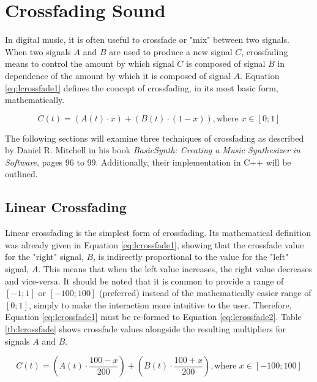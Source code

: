 \chapter{Crossfading Sound}

In digital music, it is often useful to crossfade or "mix" between two signals\footnotemark{}. When two signals $A$ and $B$ are used to produce a new signal $C$, crossfading means to control the amount by which signal $C$ is composed of signal $B$ in dependence of the amount by which it is composed of signal $A$. Equation \ref{eq:lcrossfade1} defines the concept of crossfading, in its most basic form, mathematically.

\begin{equation}
  C(t) = (A(t) \cdot x) + (B(t) \cdot (1 - x)), \text{where } x \in [0;1]
  \label{eq:lcrossfade1}
\end{equation}


The following sections will examine three techniques of crossfading as described by Daniel R. Mitchell in his book \emph{BasicSynth: Creating a Music Synthesizer in Software}, pages 96 to 99. Additionally, their implementation in C++ will be outlined.

\section{Linear Crossfading}

Linear crossfading is the simplest form of crossfading. Its mathematical definition was already given in Equation \ref{eq:lcrossfade1}, showing that the crossfade value for the "right" signal, $B$, is indirectly proportional to the value for the "left" signal, $A$. This means that when the left value increases, the right value decreases and vice-versa. It should be noted that it is common to provide a range of $[-1;1]$ or $[-100;100]$ (preferred) instead of the mathematically easier range of $[0;1]$, simply to make the interaction more intuitive to the user. Therefore, Equation \ref{eq:lcrossfade1} must be re-formed to Equation \ref{eq:lcrossfade2}. Table \ref{tb:lcrossfade} shows crossfade values alongside the resulting multipliers for signals $A$ and $B$.

\begin{equation}
  C(t) = (A(t) \cdot \frac{100 - x}{200}) + (B(t) \cdot \frac{100 + x}{200}), \text{where } x \in [-100;100]
  \label{eq:lcrossfade2}
\end{equation}

